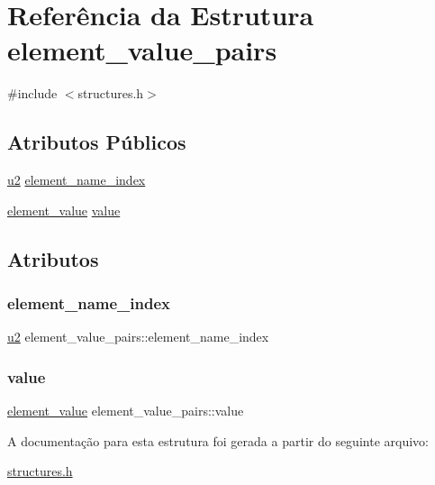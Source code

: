 \hypertarget{structelement__value__pairs}{}\section{Referência da Estrutura element\+\_\+value\+\_\+pairs}
\label{structelement__value__pairs}


{\ttfamily \#include $<$structures.\+h$>$}

\subsection*{Atributos Públicos}
\begin{DoxyCompactItemize}
\item 
\hyperlink{lista__operandos_8h_a732cde1300aafb73b0ea6c2558a7a54f}{u2} \hyperlink{structelement__value__pairs_afbd19773ad9b0623269f7fbd649b6220}{element\+\_\+name\+\_\+index}
\item 
\hyperlink{structelement__value}{element\+\_\+value} \hyperlink{structelement__value__pairs_ab1c879e0865cca531bd7565a71995668}{value}
\end{DoxyCompactItemize}


\subsection{Atributos}
\mbox{\label{structelement__value__pairs_afbd19773ad9b0623269f7fbd649b6220}} 
\subsubsection{\texorpdfstring{element\+\_\+name\+\_\+index}{element\_name\_index}}
{\footnotesize\ttfamily \hyperlink{lista__operandos_8h_a732cde1300aafb73b0ea6c2558a7a54f}{u2} element\+\_\+value\+\_\+pairs\+::element\+\_\+name\+\_\+index}

\mbox{\label{structelement__value__pairs_ab1c879e0865cca531bd7565a71995668}} 
\subsubsection{\texorpdfstring{value}{value}}
{\footnotesize\ttfamily \hyperlink{structelement__value}{element\+\_\+value} element\+\_\+value\+\_\+pairs\+::value}



A documentação para esta estrutura foi gerada a partir do seguinte arquivo\+:\begin{DoxyCompactItemize}
\item 
\hyperlink{structures_8h}{structures.\+h}\end{DoxyCompactItemize}
